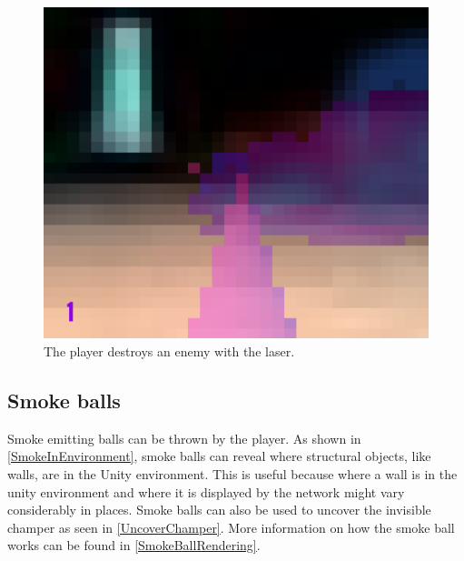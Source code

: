 \begin{figure}[p]
  \includegraphics[height=0.3\textheight, width=0.42\textheight]{images/game_systems/Shoot3.png}
  \caption{The player destroys an enemy with the laser.}
  \label{DestroyEnemy}
\end{figure}


\subsection{Smoke balls}
Smoke emitting  balls can be thrown by the player. As shown in \cref{SmokeInEnvironment}, smoke balls can reveal where structural objects, like walls, are in the Unity environment. This is useful because where a wall is in the unity environment and where it is displayed by the network might vary considerably in places. Smoke balls can also be used to uncover the invisible champer as seen in \cref{UncoverChamper}. More information on how the smoke ball works can be found in \cref{SmokeBallRendering}.

